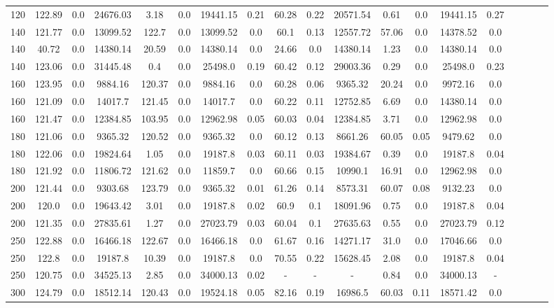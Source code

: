 \begin{sidewaystable}[!h]
\begin{tabular}{lcccccccccccccccccc}
120 & 122.89 & 0.0 & 24676.03 & 3.18 & 0.0 & 19441.15 & 0.21 & 60.28 & 0.22 & 20571.54 & 0.61 & 0.0 & 19441.15 & 0.27 \\
140 & 121.77 & 0.0 & 13099.52 & 122.7 & 0.0 & 13099.52 & 0.0 & 60.1 & 0.13 & 12557.72 & 57.06 & 0.0 & 14378.52 & 0.0 \\
140 & 40.72 & 0.0 & 14380.14 & 20.59 & 0.0 & 14380.14 & 0.0 & 24.66 & 0.0 & 14380.14 & 1.23 & 0.0 & 14380.14 & 0.0 \\
140 & 123.06 & 0.0 & 31445.48 & 0.4 & 0.0 & 25498.0 & 0.19 & 60.42 & 0.12 & 29003.36 & 0.29 & 0.0 & 25498.0 & 0.23 \\
160 & 123.95 & 0.0 & 9884.16 & 120.37 & 0.0 & 9884.16 & 0.0 & 60.28 & 0.06 & 9365.32 & 20.24 & 0.0 & 9972.16 & 0.0 \\
160 & 121.09 & 0.0 & 14017.7 & 121.45 & 0.0 & 14017.7 & 0.0 & 60.22 & 0.11 & 12752.85 & 6.69 & 0.0 & 14380.14 & 0.0 \\
160 & 121.47 & 0.0 & 12384.85 & 103.95 & 0.0 & 12962.98 & 0.05 & 60.03 & 0.04 & 12384.85 & 3.71 & 0.0 & 12962.98 & 0.0 \\
180 & 121.06 & 0.0 & 9365.32 & 120.52 & 0.0 & 9365.32 & 0.0 & 60.12 & 0.13 & 8661.26 & 60.05 & 0.05 & 9479.62 & 0.0 \\
180 & 122.06 & 0.0 & 19824.64 & 1.05 & 0.0 & 19187.8 & 0.03 & 60.11 & 0.03 & 19384.67 & 0.39 & 0.0 & 19187.8 & 0.04 \\
180 & 121.92 & 0.0 & 11806.72 & 121.62 & 0.0 & 11859.7 & 0.0 & 60.66 & 0.15 & 10990.1 & 16.91 & 0.0 & 12962.98 & 0.0 \\
200 & 121.44 & 0.0 & 9303.68 & 123.79 & 0.0 & 9365.32 & 0.01 & 61.26 & 0.14 & 8573.31 & 60.07 & 0.08 & 9132.23 & 0.0 \\
200 & 120.0 & 0.0 & 19643.42 & 3.01 & 0.0 & 19187.8 & 0.02 & 60.9 & 0.1 & 18091.96 & 0.75 & 0.0 & 19187.8 & 0.04 \\
200 & 121.35 & 0.0 & 27835.61 & 1.27 & 0.0 & 27023.79 & 0.03 & 60.04 & 0.1 & 27635.63 & 0.55 & 0.0 & 27023.79 & 0.12 \\
250 & 122.88 & 0.0 & 16466.18 & 122.67 & 0.0 & 16466.18 & 0.0 & 61.67 & 0.16 & 14271.17 & 31.0 & 0.0 & 17046.66 & 0.0 \\
250 & 122.8 & 0.0 & 19187.8 & 10.39 & 0.0 & 19187.8 & 0.0 & 70.55 & 0.22 & 15628.45 & 2.08 & 0.0 & 19187.8 & 0.04 \\
250 & 120.75 & 0.0 & 34525.13 & 2.85 & 0.0 & 34000.13 & 0.02 & - & - & - & 0.84 & 0.0 & 34000.13 &  - \\
300 & 124.79 & 0.0 & 18512.14 & 120.43 & 0.0 & 19524.18 & 0.05 & 82.16 & 0.19 & 16986.5 & 60.03 & 0.11 & 18571.42 & 0.0 \\

\end{tabular}
\end{sidewaystable}
